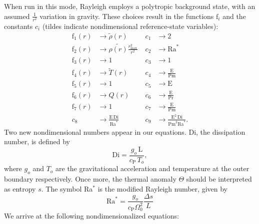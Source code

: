 \documentclass[10pt,letterpaper]{article}
\newcommand{\ff}{\mathrm{f}}
\begin{document}
When run in this mode, Rayleigh employs a polytropic background state, with an assumed $\frac{1}{r^2}$ variation in gravity.  These choices result in the functions $\ff_i$ and the constants $c_i$ (tildes indicate nondimensional reference-state variables):
\begin{align*}
	\ff_1(r) &\rightarrow \tilde{\rho}(r)\; &c_1 &\rightarrow 2 \\
	\ff_2(r) &\rightarrow \tilde{\rho(r)}\frac{r_\mathrm{max}^2}{r^2}\; &c_2 &\rightarrow \mathrm{Ra}^* \\
	\ff_3(r) &\rightarrow 1\; &c_3 &\rightarrow 1\\
	\ff_4(r) &\rightarrow \tilde{T}(r)\; &c_4 &\rightarrow \frac{\mathrm{E}}{\mathrm{Pm}} \\
	\ff_5(r) &\rightarrow 1\; &c_5 &\rightarrow \mathrm{E} \\
	\ff_6(r) &\rightarrow Q(r)\; &c_6 &\rightarrow \frac{\mathrm{E}}{\mathrm{Pr}}  \\
	\ff_7(r) &\rightarrow 1 \; &c_7 &\rightarrow \frac{\mathrm{E}}{\mathrm{Pm}} \\
	c_8&\rightarrow \frac{\mathrm{E}\,\mathrm{Di}}{\mathrm{Ra}^*} &c_9 &\rightarrow \frac{\mathrm{E}^2\,\mathrm{Di}}{\mathrm{Pm}^2\mathrm{Ra}^*}.
\end{align*}
Two new nondimensional numbers appear in our equations. Di,  the dissipation number, is defined by
\begin{equation}
	\mathrm{Di}= \frac{g_o\,\mathrm{L}}{c_\mathrm{P}\,T_o},
\end{equation}
where $g_o$ and $T_o$ are the gravitational acceleration and temperature at the outer boundary respectively. Once more, the thermal anomaly $\Theta$ should be interpreted as entropy $s$. The symbol Ra$^*$ is the modified Rayleigh number, given by
\begin{equation}
	\mathrm{Ra}^*=\frac{g_o}{c_\mathrm{P}\Omega_0^2}\frac{\Delta s}{L}   %
\end{equation}
We arrive at the following nondimensionalized equations:
\end{document}
